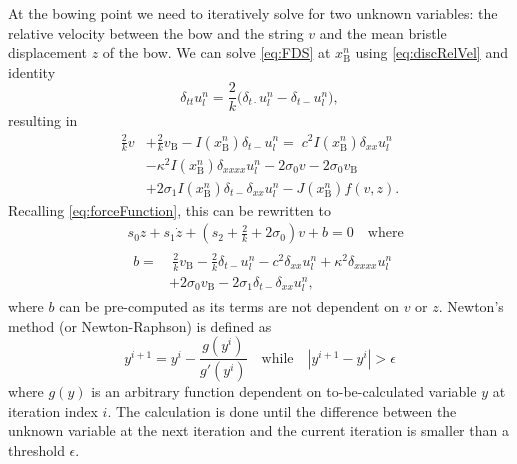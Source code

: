 \documentclass[twoside,a4paper]{article}
\begin{document}
At the bowing point we need to iteratively solve for two unknown variables: the relative velocity between the bow and the string $v$ and the mean bristle displacement $z$ of the bow.
We can solve \eqref{eq:FDS} at $x_\text{B}^n$ using \eqref{eq:discRelVel} and identity \cite{Bilbao2009}
\begin{equation}
    \delta_{tt}u_l^n = \frac{2}{k}\big(\delta_{t\cdot}u_l^n-\delta_{t-}u_l^n\big),
\end{equation}
resulting in 
\begin{equation}
\label{eq:stiffStringFDS}
\begin{aligned}
\frac{2}{k}v &+ \frac{2}{k}v_\text{B} - I(x_\text{B}^n) \delta_{t-}u_l^n = \; c^2 I(x_\text{B}^n)\delta_{xx} u_l^n \\
&-\kappa^2I(x_\text{B}^n)\delta_{xxxx} u_l^n - 2\sigma_0v
- 2\sigma_0v_\text{B}\\
&+ 2\sigma_1I(x_\text{B}^n)\delta_{t-}\delta_{xx}u_l^n - J(x_\text{B}^n)f(v, z).
\end{aligned}
\end{equation}
Recalling \eqref{eq:forceFunction}, this can be rewritten to
\begin{align}\label{eq:newtonFunction}
    &s_0z+s_1\dot z+(s_2 + \frac{2}{k} + 2\sigma_0)v + b = 0 \quad \text{where} \\
    & \begin{aligned}b =& \: \frac{2}{k}v_\text{B}-\frac{2}{k}\delta_{t-}u_l^n - c^2 \delta_{xx} u_l^n +\kappa^2\delta_{xxxx} u_l^n \\
    &+ 2\sigma_0v_\text{B}
- 2\sigma_1\delta_{t-}\delta_{xx}u_l^n,
\end{aligned}
\end{align}
where $b$ can be pre-computed as its terms are not dependent on $v$ or $z$.
Newton's method (or Newton-Raphson) is defined as
\begin{equation}
    y^{i+1} = y^{i} - \frac{g(y^i)}{g'(y^i)} \quad \text{while} \quad |y^{i+1}-y^i| > \epsilon
\end{equation}
where $g(y)$ is an arbitrary function dependent on to-be-calculated variable $y$ at iteration index $i$. The calculation is done until the difference between the unknown variable at the next iteration and the current iteration is smaller than a threshold $\epsilon$.
\end{document}
